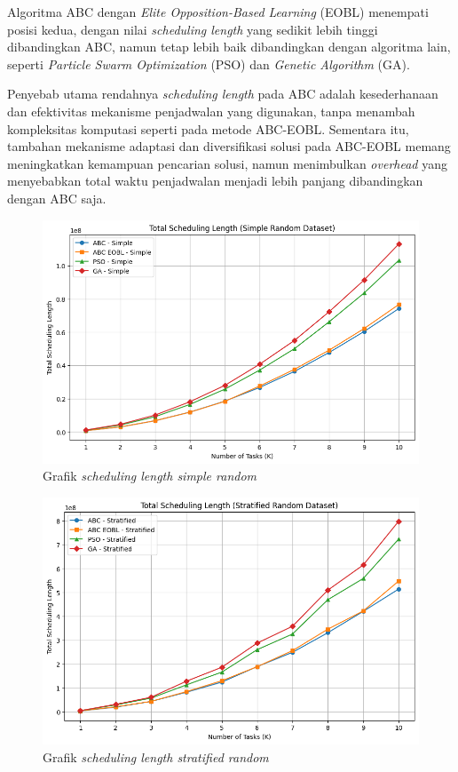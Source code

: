 Algoritma ABC dengan \textit{Elite Opposition-Based Learning} (EOBL) menempati posisi kedua, dengan nilai \textit{scheduling length} yang sedikit lebih tinggi dibandingkan ABC, namun tetap lebih baik dibandingkan dengan algoritma lain, seperti \textit{Particle Swarm Optimization} (PSO) dan \textit{Genetic Algorithm} (GA).

Penyebab utama rendahnya \textit{scheduling length} pada ABC adalah kesederhanaan dan efektivitas mekanisme penjadwalan yang digunakan, tanpa menambah kompleksitas komputasi seperti pada metode ABC-EOBL. Sementara itu, tambahan mekanisme adaptasi dan diversifikasi solusi pada ABC-EOBL memang meningkatkan kemampuan pencarian solusi, namun menimbulkan \textit{overhead} yang menyebabkan total waktu penjadwalan menjadi lebih panjang dibandingkan dengan ABC saja.

\newpage

\begin{figure} [H]
    \centering
    \includegraphics[width=0.75\linewidth]{gambar/Grafik Scheduling Length Simple Random.png}
    \caption{Grafik \textit{scheduling length simple random}}
\end{figure}

\begin{figure} [H]
    \centering
    \includegraphics[width=0.75\linewidth]{gambar/Grafik Scheduling Length Stratified Random.png}
    \caption{Grafik \textit{scheduling length stratified random}}
\end{figure}

